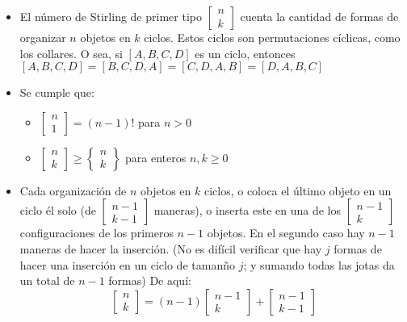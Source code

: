 \begin{itemize}
    \item{
		El n\'umero de Stirling de primer tipo
		$\left[\begin{smallmatrix}
			n\\
			k
		\end{smallmatrix}\right]$ cuenta la cantidad de formas de organizar $n$
		objetos en $k$ ciclos. Estos ciclos son permutaciones c\'iclicas, como los 
		collares. O sea, si $[A,B,C,D]$ es un ciclo, entonces 
		$[A,B,C,D] = [B,C,D,A] = [C,D,A,B] = [D,A,B,C]$
    }
    \item{
		Se cumple que:
		
		\begin{itemize} 
			\item{
			     $\left[\begin{smallmatrix}
					n\\
					1
				 \end{smallmatrix}\right] = (n-1)!$ para $n > 0$
			}
			\item{
				$\left[\begin{smallmatrix}
					n\\
					k
				\end{smallmatrix}\right]
				\geq
				\left\{\begin{smallmatrix}
					n\\
					k
				\end{smallmatrix}\right\}$ para enteros $n, k \geq 0$
		    }
		\end{itemize} 
    }
    \item{
		 Cada organizaci\'on de $n$ objetos en $k$ ciclos, o coloca el \'ultimo objeto
		 en un ciclo \'el solo (de 
		 $\left[\begin{smallmatrix}
			n-1\\
			k-1
		\end{smallmatrix}\right]$
		 maneras), o inserta este en una de los
		 $\left[\begin{smallmatrix}
			n-1\\
			k
		\end{smallmatrix}\right]$  
		configuraciones de los primeros $n-1$ objetos. En el segundo caso hay $n-1$ maneras de 
		hacer la inserci\'on. (No es dif\'icil verificar que hay $j$ formas de hacer una inserci\'on 
		en un ciclo de taman\~no $j$; y sumando todas las jotas da un total de $n-1$ formas) 
		De aqu\'i:
		$$
		\left[\begin{smallmatrix}
			n\\
			k
		\end{smallmatrix}\right]
		=
		(n-1) \left[\begin{smallmatrix}
			n-1\\
			k
		\end{smallmatrix}\right]
		+
		\left[\begin{smallmatrix}
			n-1\\
			k-1
		\end{smallmatrix}\right]
		$$ 
    }
\end{itemize}
